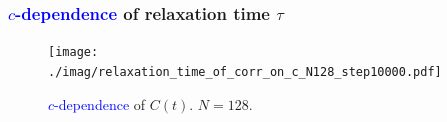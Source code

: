 \documentclass[8pt]{beamer}
\begin{document}
\begin{frame}
	\frametitle{{\textcolor{blue}{$c$-dependence}} of relaxation time $\tau$}
	\begin{figure}
		\centering
		\texttt{[image: ./imag/relaxation\_time\_of\_corr\_on\_c\_N128\_step10000.pdf]}
		\setlength{\abovecaptionskip}{0pt}
		\caption{{\textcolor{blue}{$c$-dependence}} of $C(t)$. $N=128$.}
	\end{figure}
\end{frame}


\end{document}
